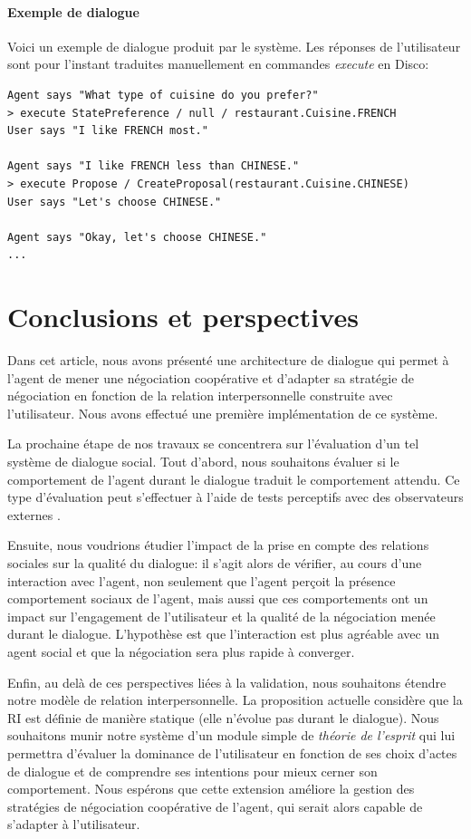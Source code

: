 \documentclass [french]{sig-alternate-05-2015}
\begin{document}
\paragraph{Exemple de dialogue}
Voici un exemple de dialogue produit par le système. Les réponses de l'utilisateur sont pour l'instant traduites manuellement en commandes \emph{execute} en Disco:
{\small
\begin{verbatim}
Agent says "What type of cuisine do you prefer?"
> execute StatePreference / null / restaurant.Cuisine.FRENCH
User says "I like FRENCH most."

Agent says "I like FRENCH less than CHINESE."
> execute Propose / CreateProposal(restaurant.Cuisine.CHINESE)
User says "Let's choose CHINESE."

Agent says "Okay, let's choose CHINESE."
...
\end{verbatim}
}

\section{Conclusions et perspectives}
\label{conc}
Dans cet article, nous avons présenté une architecture de dialogue qui permet à l'agent de mener une négociation coopérative et d'adapter sa stratégie de négociation en fonction de la relation interpersonnelle construite avec l'utilisateur. Nous avons effectué une première implémentation de ce système. 

\par La prochaine étape de nos travaux se concentrera sur l'évaluation d'un tel système de dialogue social. Tout d'abord, nous souhaitons évaluer si le comportement de l'agent durant le dialogue traduit le comportement attendu. Ce type d'évaluation peut s'effectuer à l'aide de tests perceptifs avec des observateurs externes \cite{bickmore2012empirical}.

\par Ensuite, nous voudrions étudier l'impact de la prise en compte des relations sociales sur la qualité du dialogue: il s'agit alors de vérifier, au cours d'une interaction avec l'agent, non seulement que l'agent perçoit la présence comportement sociaux de l'agent, mais aussi que ces comportements ont un impact sur l'engagement de l'utilisateur et la qualité de la négociation menée durant le dialogue. L'hypothèse est que l'interaction est plus agréable avec un agent social et que la négociation sera plus rapide à converger.

\par Enfin, au delà de ces perspectives liées à la validation, nous souhaitons étendre notre modèle de relation interpersonnelle. La proposition actuelle considère que la RI est définie de manière statique (elle n'évolue pas durant le dialogue). Nous souhaitons munir notre système d'un module simple de \emph{théorie de l'esprit} qui lui permettra d'évaluer la dominance de l'utilisateur en fonction de ses choix d'actes de dialogue et de comprendre ses intentions pour mieux cerner son comportement. Nous espérons que cette extension améliore la gestion des stratégies de négociation coopérative de l'agent, qui serait alors capable de s'adapter à l'utilisateur.
 
\vskip 5pt


\end{document}
